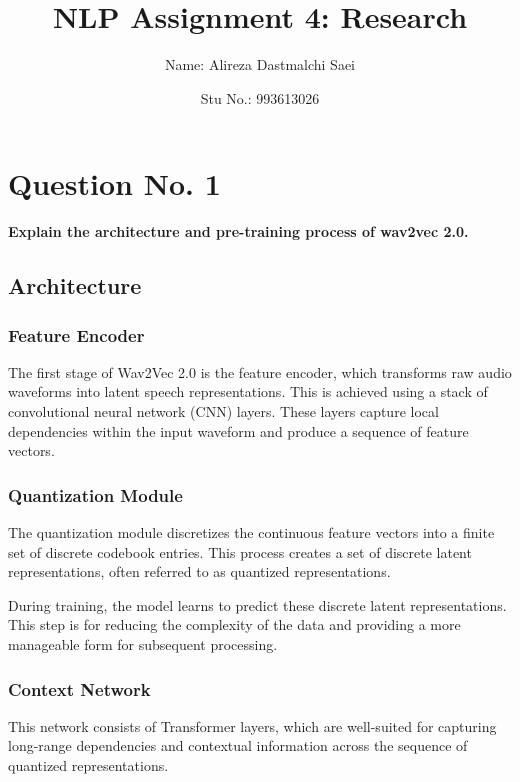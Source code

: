 \documentclass{article}
\title{\textbf{\Huge NLP Assignment 4: Research}}
\author{Name: Alireza Dastmalchi Saei}
\date{Stu No.: 993613026}
\begin{document}
\maketitle

\pagebreak

\tableofcontents

\pagebreak


\section{Question No. 1}
\textbf{Explain the architecture and pre-training process of wav2vec 2.0.}


\subsection{Architecture}

\subsubsection{Feature Encoder}

The first stage of Wav2Vec 2.0 is the feature encoder, which transforms raw audio waveforms into latent speech representations. This is achieved using a stack of convolutional neural network (CNN) layers. These layers capture local dependencies within the input waveform and produce a sequence of feature vectors.


\subsubsection{Quantization Module}

The quantization module discretizes the continuous feature vectors into a finite set of discrete codebook entries. This process creates a set of discrete latent representations, often referred to as quantized representations.

During training, the model learns to predict these discrete latent representations. This step is for reducing the complexity of the data and providing a more manageable form for subsequent processing.


\subsubsection{Context Network}

This network consists of Transformer layers, which are well-suited for capturing long-range dependencies and contextual information across the sequence of quantized representations.
\end{document}
